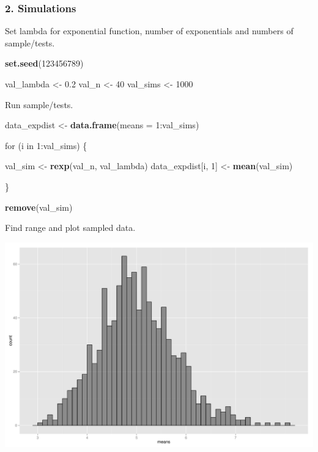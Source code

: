 \documentclass[]{article}
\newenvironment{Shaded}{\begin{snugshade}}{\end{snugshade}}
\newcommand{\KeywordTok}[1]{\textcolor[rgb]{0.13,0.29,0.53}{\textbf{{#1}}}}
\newcommand{\DataTypeTok}[1]{\textcolor[rgb]{0.13,0.29,0.53}{{#1}}}
\newcommand{\DecValTok}[1]{\textcolor[rgb]{0.00,0.00,0.81}{{#1}}}
\newcommand{\FloatTok}[1]{\textcolor[rgb]{0.00,0.00,0.81}{{#1}}}
\newcommand{\StringTok}[1]{\textcolor[rgb]{0.31,0.60,0.02}{{#1}}}
\newcommand{\NormalTok}[1]{{#1}}
\begin{document}
\subsubsection{2. Simulations}\label{simulations}

Set lambda for exponential function, number of exponentials and numbers
of sample/tests.

\begin{Shaded}
\begin{Highlighting}[]
\KeywordTok{set.seed}\NormalTok{(}\DecValTok{123456789}\NormalTok{)}

\NormalTok{val_lambda <-}\StringTok{ }\FloatTok{0.2}
\NormalTok{val_n <-}\StringTok{ }\DecValTok{40}
\NormalTok{val_sims <-}\StringTok{ }\DecValTok{1000}
\end{Highlighting}
\end{Shaded}

Run sample/tests.

\begin{Shaded}
\begin{Highlighting}[]
\NormalTok{data_expdist <-}\StringTok{ }\KeywordTok{data.frame}\NormalTok{(}\DataTypeTok{means =} \DecValTok{1}\NormalTok{:val_sims)}

\NormalTok{for (i in }\DecValTok{1}\NormalTok{:val_sims) \{}
 
  \NormalTok{val_sim <-}\StringTok{ }\KeywordTok{rexp}\NormalTok{(val_n, val_lambda)}
  \NormalTok{data_expdist[i, }\DecValTok{1}\NormalTok{] <-}\StringTok{ }\KeywordTok{mean}\NormalTok{(val_sim)}
 
\NormalTok{\}}

\KeywordTok{remove}\NormalTok{(val_sim)}
\end{Highlighting}
\end{Shaded}

Find range and plot sampled data.

\includegraphics{figure/unnamed-chunk-4-1.pdf}
\end{document}

